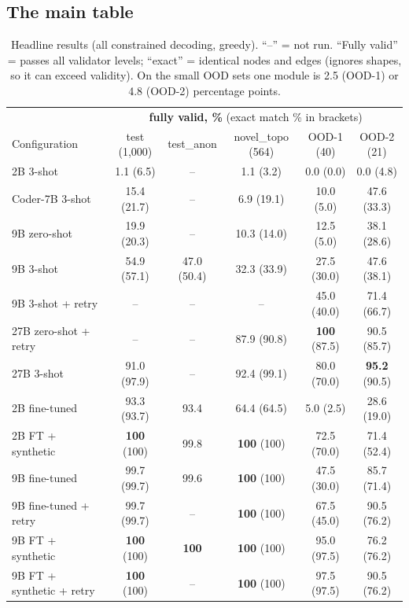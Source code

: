 \documentclass[11pt,a4paper]{article}
\begin{document}
\subsection{The main table}
\begin{table}[H]\centering\small
\begin{tabular}{lccccc}\toprule
& \multicolumn{5}{c}{\textbf{fully valid, \%} \quad(exact match \% in brackets)} \\
Configuration & test (1{,}000) & test\_anon & novel\_topo (564) & OOD-1 (40) & OOD-2 (21) \\\midrule
2B 3-shot & 1.1 (6.5) & -- & 1.1 (3.2) & 0.0 (0.0) & 0.0 (4.8) \\
Coder-7B 3-shot & 15.4 (21.7) & -- & 6.9 (19.1) & 10.0 (5.0) & 47.6 (33.3) \\
9B zero-shot & 19.9 (20.3) & -- & 10.3 (14.0) & 12.5 (5.0) & 38.1 (28.6) \\
9B 3-shot & 54.9 (57.1) & 47.0 (50.4) & 32.3 (33.9) & 27.5 (30.0) & 47.6 (38.1) \\
9B 3-shot + retry & -- & -- & -- & 45.0 (40.0) & 71.4 (66.7) \\
27B zero-shot + retry & -- & -- & 87.9 (90.8) & \textbf{100} (87.5) & 90.5 (85.7) \\
27B 3-shot & 91.0 (97.9) & -- & 92.4 (99.1) & 80.0 (70.0) & \textbf{95.2} (90.5) \\\midrule
2B fine-tuned & 93.3 (93.7) & 93.4 & 64.4 (64.5) & 5.0 (2.5) & 28.6 (19.0) \\
2B FT + synthetic & \textbf{100} (100) & 99.8 & \textbf{100} (100) & 72.5 (70.0) & 71.4 (52.4) \\
9B fine-tuned & 99.7 (99.7) & 99.6 & \textbf{100} (100) & 47.5 (30.0) & 85.7 (71.4) \\
9B fine-tuned + retry & 99.7 (99.7) & -- & \textbf{100} (100) & 67.5 (45.0) & 90.5 (76.2) \\
9B FT + synthetic & \textbf{100} (100) & \textbf{100} & \textbf{100} (100) & 95.0 (97.5) & 76.2 (76.2) \\
9B FT + synthetic + retry & \textbf{100} (100) & -- & \textbf{100} (100) & 97.5 (97.5) & 90.5 (76.2) \\\bottomrule
\end{tabular}
\caption{Headline results (all constrained decoding, greedy). ``--'' = not run. ``Fully valid'' = passes all
validator levels; ``exact'' = identical nodes and edges (ignores shapes, so it can exceed validity). On the small OOD
sets one module is 2.5 (OOD-1) or 4.8 (OOD-2) percentage points.}\label{tab:main}
\end{table}
\end{document}
